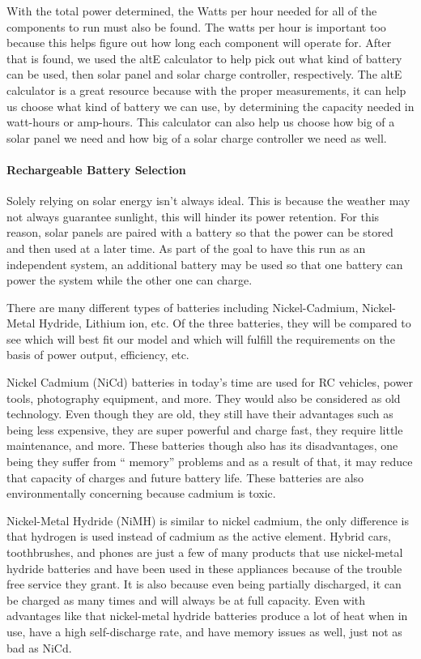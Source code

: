 With the total power determined, the Watts per hour needed for all of the components to run must also be found. The watts per hour is important too because this helps figure out how long each component will operate for. After that is found, we used the altE calculator to help pick out what kind of battery can be used, then solar panel and solar charge controller, respectively. The altE calculator is a great resource because with the proper measurements, it can help us choose what kind of battery we can use, by determining the capacity needed in watt-hours or amp-hours. This calculator can also help us choose how big of a solar panel we need and how big of a solar charge controller we need as well.
\paragraph{Rechargeable Battery Selection}
Solely relying on solar energy isn’t always ideal. This is because the weather may not always guarantee sunlight, this will hinder its power retention. For this reason, solar panels are paired with a battery so that the power can be stored and then used at a later time. As part of the goal to have this run as an independent system, an additional battery may be used so that one battery can power the system while the other one can charge.

There are many different types of batteries including Nickel-Cadmium, Nickel-Metal Hydride, Lithium ion, etc. Of the three batteries, they will be compared to see which will best fit our model and which will fulfill the requirements on the basis of power output, efficiency, etc.

Nickel Cadmium (NiCd) batteries in today’s time are used for RC vehicles, power tools, photography equipment, and more. They would also be considered as old technology. Even though they are old, they still have their advantages such as being less expensive, they are super powerful and charge fast, they require little maintenance, and more. These batteries though also has its disadvantages, one being they suffer from “ memory” problems and as a result of that, it may reduce that capacity of charges and future battery life. These batteries are also environmentally concerning because cadmium is toxic.

Nickel-Metal Hydride (NiMH) is similar to nickel cadmium, the only difference is that hydrogen is used instead of cadmium as the active element. Hybrid cars, toothbrushes, and phones are just a few of many products that use nickel-metal hydride batteries and have been used in these appliances because of the trouble free service they grant. It is also because even being partially discharged, it can be charged as many times and will always be at full capacity. Even with advantages like that nickel-metal hydride batteries produce a lot of heat when in use, have a high self-discharge rate, and have memory issues as well, just not as bad as NiCd.

